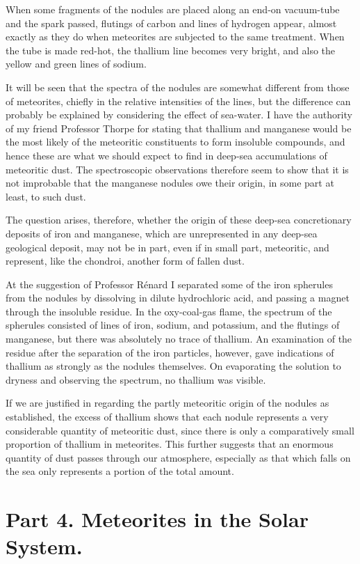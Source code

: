 \documentclass[a4paper, 12pt, oneside, polutonikogreek, english]{article}
\begin{document}
When some fragments of the nodules are placed along an end-on vacuum-tube and the spark passed, flutings of carbon and lines of hydrogen appear, almost exactly as they do when meteorites are subjected to the same treatment. When the tube is made red-hot, the thallium line becomes very bright, and also the yellow and green lines of sodium.

It will be seen that the spectra of the nodules are somewhat different from those of meteorites, chiefly in the relative intensities of the lines, but the difference can probably be explained by considering the effect of sea-water. I have the authority of my friend Professor Thorpe for stating that thallium and manganese would be the most likely of the meteoritic constituents to form insoluble compounds, and hence these are what we should expect to find in deep-sea accumulations of meteoritic dust. The spectroscopic observations therefore seem to show that it is not improbable that the manganese nodules owe their origin, in some part at least, to such dust.

The question arises, therefore, whether the origin of these deep-sea concretionary deposits of iron and manganese, which are unrepresented in any deep-sea geological deposit, may not be in part, even if in small part, meteoritic, and represent, like the chondroi, another form of fallen dust.

At the suggestion of Professor Rénard I separated some of the iron spherules from the nodules by dissolving in dilute hydrochloric acid, and passing a magnet through the insoluble residue. In the oxy-coal-gas flame, the spectrum of the spherules consisted of lines of iron, sodium, and potassium, and the flutings of manganese, but there was absolutely no trace of thallium. An examination of the residue after the separation of the iron particles, however, gave indications of thallium as strongly as the nodules themselves. On evaporating the solution to dryness and observing the spectrum, no thallium was visible.

If we are justified in regarding the partly meteoritic origin of the nodules as established, the excess of thallium shows that each nodule represents a very considerable quantity of meteoritic dust, since there is only a comparatively small proportion of thallium in meteorites. This further suggests that an enormous quantity of dust passes through our atmosphere, especially as that which falls on the sea only represents a portion of the total amount.
\clearpage
\section{Part 4. Meteorites in the Solar System.}
\end{document}
